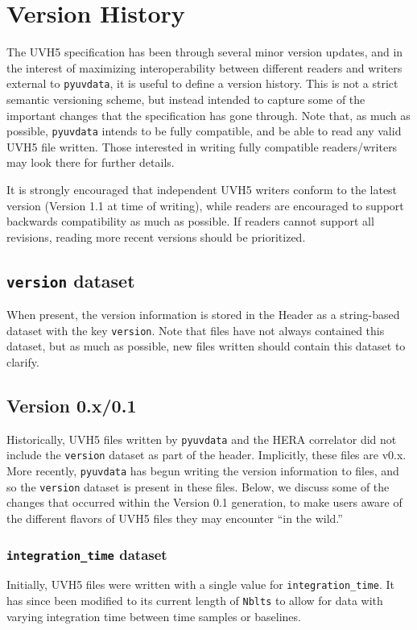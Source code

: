 \documentclass[11pt, oneside]{article}
\begin{document}
\section{Version History}
\label{sec:version_history}
The UVH5 specification has been through several minor version updates, and in
the interest of maximizing interoperability between different readers and
writers external to \verb+pyuvdata+, it is useful to define a version
history. This is not a strict semantic versioning scheme, but instead intended
to capture some of the important changes that the specification has gone
through. Note that, as much as possible, \verb+pyuvdata+ intends to be fully
compatible, and be able to read any valid UVH5 file written. Those interested in
writing fully compatible readers/writers may look there for further details.

It is strongly encouraged that independent UVH5 writers conform to the latest
version (Version 1.1 at time of writing), while readers are encouraged to
support backwards compatibility as much as possible. If readers cannot support
all revisions, reading more recent versions should be prioritized.


\subsection{\texttt{version} dataset}
When present, the version information is stored in the Header as a string-based
dataset with the key \verb+version+. Note that files have not always contained
this dataset, but as much as possible, new files written should contain this
dataset to clarify.

\subsection{Version 0.x/0.1}
Historically, UVH5 files written by \verb+pyuvdata+ and the HERA correlator did
not include the \verb+version+ dataset as part of the header. Implicitly, these
files are v0.x. More recently, \verb+pyuvdata+ has begun writing the version
information to files, and so the \verb+version+ dataset is present in these
files. Below, we discuss some of the changes that occurred within the Version
0.1 generation, to make users aware of the different flavors of UVH5 files they
may encounter ``in the wild.''

\subsubsection{\texttt{integration\_time} dataset}
Initially, UVH5 files were written with a single value for
\verb+integration_time+. It has since been modified to its current length of
\verb+Nblts+ to allow for data with varying integration time between time
samples or baselines.
\end{document}
